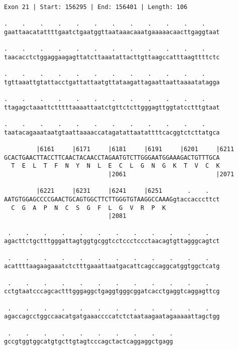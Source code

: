 \documentclass{article}
\begin{document}
\newpage
\begin{Verbatim}[fontfamily=courier]
Exon 21 | Start: 156295 | End: 156401 | Length: 106

.    .    .    .    .    .    .    .    .    .    .    .    
gaattaacatattttgaatctgaatggttaataaacaaatgaaaaacaacttgaggtaat

.    .    .    .    .    .    .    .    .    .    .    .    
taacacctctggaggaagagttatcttaaatattacttgttaagccatttaagttttctc

.    .    .    .    .    .    .    .    .    .    .    .    
tgttaaattgtattacctgattattaatgttataagattagaattaattaaaatatagga

.    .    .    .    .    .    .    .    .    .    .    .    
ttagagctaaattctttttaaaattaatctgttctcttgggagttggtatcctttgtaat

.    .    .    .    .    .    .    .    .    .    .    .    
taatacagaaataatgtaattaaaaccatagatattaatattttcacggtctcttatgca

         |6161     |6171     |6181     |6191     |6201     |6211
GCACTGAACTTACCTTCAACTACAACCTAGAATGTCTTGGGAATGGAAAGACTGTTTGCA
  T  E  L  T  F  N  Y  N  L  E  C  L  G  N  G  K  T  V  C  K
                             |2061                         |2071

         |6221     |6231     |6241     |6251       .    .   
AATGTGGAGCCCCGAACTGCAGTGGCTTCTTGGGTGTAAGGCCAAAGgtaccacccttct
  C  G  A  P  N  C  S  G  F  L  G  V  R  P  K               
                             |2081                          

 .    .    .    .    .    .    .    .    .    .    .    .   
agacttctgctttgggattagtggtgcggtcctccctccctaacagtgttagggcagtct

 .    .    .    .    .    .    .    .    .    .    .    .   
acattttaagaagaaatctctttgaaattaatgacattcagccaggcatggtggctcatg

 .    .    .    .    .    .    .    .    .    .    .    .   
cctgtaatcccagcactttgggaggctgaggtgggcggatcacctgaggtcaggagttcg

 .    .    .    .    .    .    .    .    .    .    .    .   
agaccagcctggccaacatgatgaaaccccatctctaataagaatagaaaaattagctgg

 .    .    .    .    .    .    .    .    .    .
gccgtggtggcatgtgcttgtagtcccagctactcaggaggctgagg
\end{Verbatim}
\newpage
\end{document}

